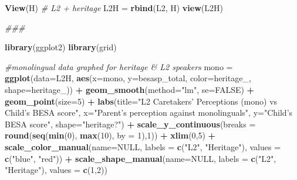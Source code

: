 \documentclass[
]{article}
\newenvironment{Shaded}{\begin{snugshade}}{\end{snugshade}}
\newcommand{\CommentTok}[1]{\textcolor[rgb]{0.56,0.35,0.01}{\textit{#1}}}
\newcommand{\DataTypeTok}[1]{\textcolor[rgb]{0.13,0.29,0.53}{#1}}
\newcommand{\DecValTok}[1]{\textcolor[rgb]{0.00,0.00,0.81}{#1}}
\newcommand{\KeywordTok}[1]{\textcolor[rgb]{0.13,0.29,0.53}{\textbf{#1}}}
\newcommand{\NormalTok}[1]{#1}
\newcommand{\OperatorTok}[1]{\textcolor[rgb]{0.81,0.36,0.00}{\textbf{#1}}}
\newcommand{\OtherTok}[1]{\textcolor[rgb]{0.56,0.35,0.01}{#1}}
\newcommand{\StringTok}[1]{\textcolor[rgb]{0.31,0.60,0.02}{#1}}
\begin{document}
\begin{Shaded}
\begin{Highlighting}[]
\KeywordTok{View}\NormalTok{(H)}
\CommentTok{# L2 + heritage}
\NormalTok{L2H =}\StringTok{ }\KeywordTok{rbind}\NormalTok{(L2, H)}
\KeywordTok{view}\NormalTok{(L2H)}


\CommentTok{###}

\KeywordTok{library}\NormalTok{(ggplot2)}
\KeywordTok{library}\NormalTok{(grid)}

\CommentTok{#monolingual data graphed for heritage & L2 speakers}
\NormalTok{mono =}\StringTok{ }\KeywordTok{ggplot}\NormalTok{(}\DataTypeTok{data=}\NormalTok{L2H, }\KeywordTok{aes}\NormalTok{(}\DataTypeTok{x=}\NormalTok{mono, }\DataTypeTok{y=}\NormalTok{besasp_total, }\DataTypeTok{color=}\NormalTok{heritage_, }\DataTypeTok{shape=}\NormalTok{heritage_)) }\OperatorTok{+}
\StringTok{  }\KeywordTok{geom_smooth}\NormalTok{(}\DataTypeTok{method=}\StringTok{"lm"}\NormalTok{, }\DataTypeTok{se=}\OtherTok{FALSE}\NormalTok{) }\OperatorTok{+}
\StringTok{  }\KeywordTok{geom_point}\NormalTok{(}\DataTypeTok{size=}\DecValTok{5}\NormalTok{) }\OperatorTok{+}
\StringTok{  }\KeywordTok{labs}\NormalTok{(}\DataTypeTok{title=}\StringTok{"L2 Caretakers' Perceptions (mono) vs Child's BESA score"}\NormalTok{, }\DataTypeTok{x=}\StringTok{"Parent's perception against monolinguals"}\NormalTok{, }\DataTypeTok{y=}\StringTok{"Child's BESA score"}\NormalTok{, }\DataTypeTok{shape=}\StringTok{"heritage?"}\NormalTok{) }\OperatorTok{+}\StringTok{  }
\StringTok{  }\KeywordTok{scale_y_continuous}\NormalTok{(}\DataTypeTok{breaks =} \KeywordTok{round}\NormalTok{(}\KeywordTok{seq}\NormalTok{(}\KeywordTok{min}\NormalTok{(}\DecValTok{0}\NormalTok{), }\KeywordTok{max}\NormalTok{(}\DecValTok{10}\NormalTok{), }\DataTypeTok{by =} \DecValTok{1}\NormalTok{),}\DecValTok{1}\NormalTok{)) }\OperatorTok{+}
\StringTok{  }\KeywordTok{xlim}\NormalTok{(}\DecValTok{0}\NormalTok{,}\DecValTok{5}\NormalTok{) }\OperatorTok{+}
\StringTok{  }\KeywordTok{scale_color_manual}\NormalTok{(}\DataTypeTok{name=}\OtherTok{NULL}\NormalTok{,}
                     \DataTypeTok{labels =} \KeywordTok{c}\NormalTok{(}\StringTok{"L2"}\NormalTok{, }\StringTok{"Heritage"}\NormalTok{),}
                     \DataTypeTok{values =} \KeywordTok{c}\NormalTok{(}\StringTok{"blue"}\NormalTok{, }\StringTok{"red"}\NormalTok{)) }\OperatorTok{+}
\StringTok{  }\KeywordTok{scale_shape_manual}\NormalTok{(}\DataTypeTok{name=}\OtherTok{NULL}\NormalTok{,}
                     \DataTypeTok{labels =} \KeywordTok{c}\NormalTok{(}\StringTok{"L2"}\NormalTok{, }\StringTok{"Heritage"}\NormalTok{),}
                     \DataTypeTok{values =} \KeywordTok{c}\NormalTok{(}\DecValTok{1}\NormalTok{,}\DecValTok{2}\NormalTok{))}


\end{Highlighting}
\end{Shaded}
\end{document}
